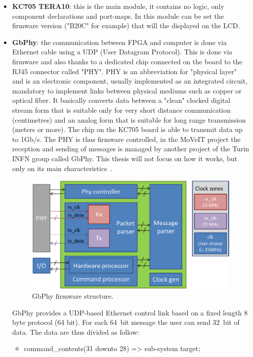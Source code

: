 \begin{itemize}
	\item \textbf{KC705 TERA10}: this is the main module, it contains no logic, only component declarations and port-maps. In this module can be set the firmware version ("B20C" for example) that will the displayed on the LCD.
	\item \textbf{GbPhy}: the communication between FPGA and computer is done via Ethernet cable using a UDP (User Datagram Protocol). This is done via firmware and also thanks to a dedicated chip connected on the board to the RJ45 connector called "PHY".
	\newline
	PHY is an abbreviation for "physical layer" and is an electronic component, usually implemented as an integrated circuit, mandatory to implement links between physical mediums such as copper or optical fiber. It basically converts data between a "clean" clocked digital stream form that is suitable only for very short distance communication (centimetres) and an analog form that is suitable for long range transmission (meters or more).
	The chip on the KC705 board is able to transmit data up to 1Gb/s.
	\newline
	The PHY is thus firmware controlled, in the MoVeIT project the reception and sending of messages is managed by another project of the Turin INFN group called GbPhy. This thesis will  not focus on how it works, but only on its main characteristics~\cite{gbphy}.     
	\begin{figure}[H]
		\centering
		\includegraphics[width=0.6\linewidth]{IMG/ch4/PHY100}
		\caption{GbPhy firmware structure.}
		\label{fig:phy100}
	\end{figure}
	\noindent GbPhy provides a UDP-based Ethernet control link based on a fixed length 8 byte protocol (64 bit).
	For each 64~bit message the user can send 32~bit of data. The data are thus divided as follow:
	\begin{itemize}
		\item command\_contents(31 downto 28) => sub-system target;

\end{itemize}
\end{itemize}
